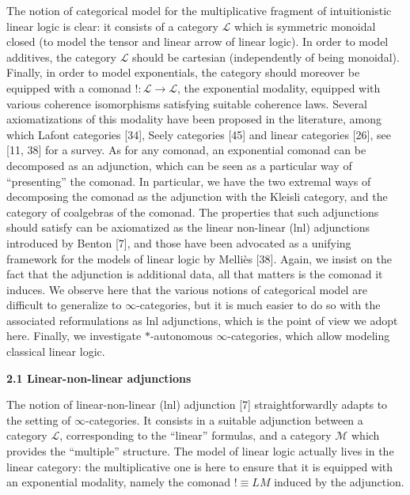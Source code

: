 \documentclass[10pt,a4paper]{article}
\begin{document}
The notion of categorical model for the multiplicative fragment of intuitionistic linear logic is clear: it consists of a category ${\mathcal{L}}$ which is symmetric monoidal closed (to model the tensor and linear arrow of linear logic). In order to model additives, the category ${\mathcal{L}}$ should be cartesian (independently of being monoidal). Finally, in order to model exponentials, the category should moreover be equipped with a comonad $\mathop{!}:{\mathcal{L}}\to{\mathcal{L}}$, the exponential modality, equipped with various coherence isomorphisms satisfying suitable coherence laws. Several axiomatizations of this modality have been proposed in the literature, among which Lafont categories [34], Seely categories [45] and linear categories [26], see [11, 38] for a survey. As for any comonad, an exponential comonad can be decomposed as an adjunction, which can be seen as a particular way of “presenting” the comonad. In particular, we have the two extremal ways of decomposing the comonad as the adjunction with the Kleisli category, and the category of coalgebras of the comonad. The properties that such adjunctions should satisfy can be axiomatized as the linear non-linear (lnl) adjunctions introduced by Benton [7], and those have been advocated as a unifying framework for the models of linear logic by Melliès [38]. Again, we insist on the fact that the adjunction is additional data, all that matters is the comonad it induces. We observe here that the various notions of categorical model are difficult to generalize to $\infty$-categories, but it is much easier to do so with the associated reformulations as lnl adjunctions, which is the point of view we adopt here. Finally, we investigate $*$-autonomous $\infty$-categories, which allow modeling classical linear logic.\par
 
 
 
\par\medskip\noindent\textbf{2.1 Linear-non-linear adjunctions}\par
 
 
The notion of linear-non-linear (lnl) adjunction [7] straightforwardly adapts to the setting of $\infty$-categories. It consists in a suitable adjunction between a category ${\mathcal{L}}$, corresponding to the “linear” formulas, and a category ${\mathcal{M}}$ which provides the “multiple” structure. The model of linear logic actually lives in the linear category: the multiplicative one is here to ensure that it is equipped with an exponential modality, namely the comonad $\mathop{!}\equiv LM$ induced by the adjunction.\par
 
\end{document}
